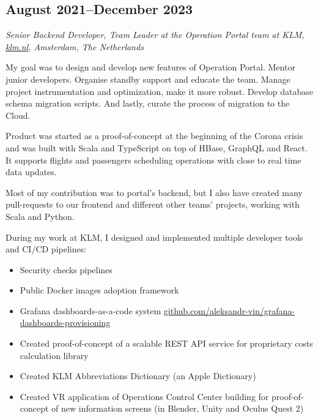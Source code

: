 \subsection*{August 2021--December 2023}

\textit{Senior Backend Developer, Team Leader at the Operation Portal
team at KLM, \href{https://klm.nl}{\url{klm.nl}}, Amsterdam, The
Netherlands}

My goal was to design and develop new features of Operation
Portal. Mentor junior developers. Organise standby support and
educate the team. Manage project instrumentation and optimization,
make it more robust.  Develop database schema migration scripts. And
lastly, curate the process of migration to the Cloud.

Product was started as a proof-of-concept at the beginning of the
Corona crisis and was built with Scala and TypeScript on top of HBase,
GraphQL and React. It supports flights and passengers scheduling
operations with close to real time data updates.

Most of my contribution was to portal's backend, but I also have
created many pull-requests to our frontend and different other teams'
projects, working with Scala and Python.

During my work at KLM, I designed and implemented multiple developer
tools and CI/CD pipelines:
\begin{itemize}[noitemsep, nosep]
  \item Security checks pipelines
  \item Public Docker images adoption framework
  \item Grafana dashboards-as-a-code system
\href{https://github.com/aleksandr-vin/grafana-dashboards-provisioning}{\url{github.com/aleksandr-vin/grafana-dashboards-provisioning}}
  \item Created proof-of-concept of a scalable REST API service for
proprietary costs calculation library
  \item Created KLM Abbreviations Dictionary (an Apple Dictionary)
  \item Created VR application of Operations Control Center building
for proof-of-concept of new information screens (in Blender, Unity and
Oculus Quest 2)
\end{itemize}
